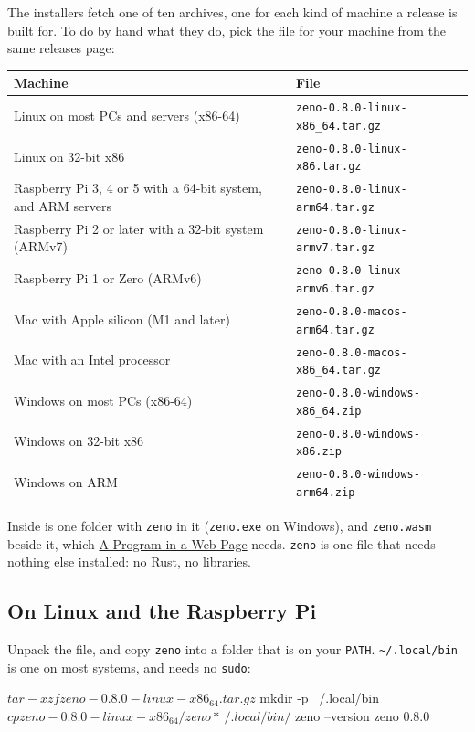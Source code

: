 The installers fetch one of ten archives, one for each kind of machine
a release is built for. To do by hand what they do, pick the file for
your machine from the same releases page:

\begin{center}
\begin{tabular}{P{6.6cm}l}
\toprule
Machine & File \\
\midrule
Linux on most PCs and servers (x86-64) & \verb|zeno-0.8.0-linux-x86_64.tar.gz| \\
Linux on 32-bit x86 & \verb|zeno-0.8.0-linux-x86.tar.gz| \\
Raspberry Pi 3, 4 or 5 with a 64-bit system, and ARM servers & \verb|zeno-0.8.0-linux-arm64.tar.gz| \\
Raspberry Pi 2 or later with a 32-bit system (ARMv7) & \verb|zeno-0.8.0-linux-armv7.tar.gz| \\
Raspberry Pi 1 or Zero (ARMv6) & \verb|zeno-0.8.0-linux-armv6.tar.gz| \\
Mac with Apple silicon (M1 and later) & \verb|zeno-0.8.0-macos-arm64.tar.gz| \\
Mac with an Intel processor & \verb|zeno-0.8.0-macos-x86_64.tar.gz| \\
Windows on most PCs (x86-64) & \verb|zeno-0.8.0-windows-x86_64.zip| \\
Windows on 32-bit x86 & \verb|zeno-0.8.0-windows-x86.zip| \\
Windows on ARM & \verb|zeno-0.8.0-windows-arm64.zip| \\
\bottomrule
\end{tabular}
\end{center}

Inside is one folder with \verb|zeno| in it (\verb|zeno.exe| on
Windows), and \verb|zeno.wasm| beside it, which
\hyperref[ch-web]{A Program in a Web Page} needs. \verb|zeno| is one
file that needs nothing else installed: no Rust, no libraries.

\subsection{On Linux and the Raspberry Pi}

Unpack the file, and copy \verb|zeno| into a folder that is on your
\verb|PATH|. \verb|~/.local/bin| is one on most systems, and needs no
\verb|sudo|:

\begin{zenofrag}[lang=shell]
$ tar -xzf zeno-0.8.0-linux-x86_64.tar.gz
$ mkdir -p ~/.local/bin
$ cp zeno-0.8.0-linux-x86_64/zeno* ~/.local/bin/
$ zeno --version
zeno 0.8.0
\end{zenofrag}

